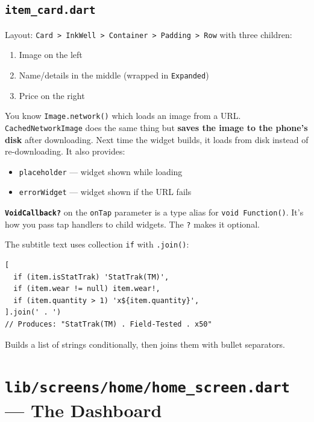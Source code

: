 \documentclass[11pt, a4paper]{article}
\begin{document}
\subsection{\texttt{item\_card.dart}}

Layout: \texttt{Card > InkWell > Container > Padding > Row} with three children:
\begin{enumerate}
    \item Image on the left
    \item Name/details in the middle (wrapped in \texttt{Expanded})
    \item Price on the right
\end{enumerate}

\begin{conceptbox}[title=\textbf{CachedNetworkImage}]
You know \texttt{Image.network()} which loads an image from a URL. \texttt{CachedNetworkImage} does the same thing but \textbf{saves the image to the phone's disk} after downloading. Next time the widget builds, it loads from disk instead of re-downloading. It also provides:
\begin{itemize}
    \item \texttt{placeholder} --- widget shown while loading
    \item \texttt{errorWidget} --- widget shown if the URL fails
\end{itemize}
\end{conceptbox}

\textbf{\texttt{VoidCallback?}} on the \texttt{onTap} parameter is a type alias for \texttt{void Function()}. It's how you pass tap handlers to child widgets. The \texttt{?} makes it optional.

The subtitle text uses collection \texttt{if} with \texttt{.join()}:

\begin{lstlisting}[numbers=none]
[
  if (item.isStatTrak) 'StatTrak(TM)',
  if (item.wear != null) item.wear!,
  if (item.quantity > 1) 'x${item.quantity}',
].join(' . ')
// Produces: "StatTrak(TM) . Field-Tested . x50"
\end{lstlisting}

Builds a list of strings conditionally, then joins them with bullet separators.

\newpage

\section{\texttt{lib/screens/home/home\_screen.dart} --- The Dashboard}
\end{document}
